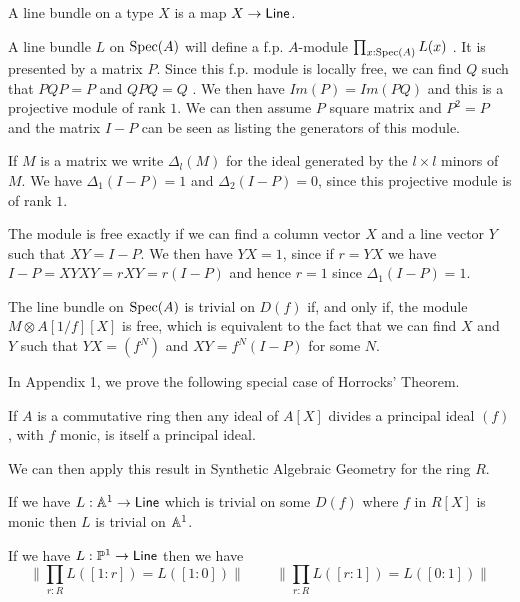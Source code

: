 A line bundle on a type $X$ is a map $X\rightarrow \mathsf{Line}$.


\medskip

 A line bundle $L$ on $\operatorname{Spec}(A)$ will define a f.p. $A$-module $\prod_{x:\operatorname{Spec}(A)}L(x)$ \cite{draft}.
It is presented by a matrix $P$.
Since this f.p. module is locally free, we can find $Q$ such that $PQP = P$ and
$QPQ = Q$ \cite{lombardi-quitte}. We then have $Im(P) = Im(PQ)$ and this is a projective module of rank $1$. We can then assume $P$ square matrix and
$P^2 = P$ and the matrix $I-P$ can  be seen as listing the generators of this module.

If $M$ is a matrix we write $\Delta_l(M)$ for the ideal generated by the $l\times l$ minors of
$M$. We have $\Delta_1(I-P) = 1$ and $\Delta_2(I-P) = 0$, since this projective module is of rank $1$.

The module is free exactly if we can find a column vector $X$ and a line vector $Y$ such that
$XY = I-P$. We then have $YX = 1$, since if $r = YX$ we have $I-P = XYXY = rXY = r(I-P)$ and
hence $r = 1$ since $\Delta_1(I-P) = 1$.

\medskip

The line bundle on $\operatorname{Spec}(A)$ is trivial on $D(f)$ if, and only if, the module $M\otimes A[1/f][X]$ is free, which
is equivalent to the fact that we can find $X$ and $Y$ such that $YX = (f^N)$ and $XY = f^N(I-P)$ for some $N$.

In Appendix 1, we prove the following special case of Horrocks' Theorem.

\begin{lemma}%
  If $A$ is a commutative ring
  then any ideal of $A[X]$ divides a principal ideal $(f)$, with $f$ monic, is itself a principal ideal.
\end{lemma}

We can then apply this result in Synthetic Algebraic Geometry for the ring $R$.

\begin{proposition}
  If we have $L:\mathbb{A}^1\rightarrow \mathsf{Line}$ which is trivial on some $D(f)$ where $f$ in $R[X]$ is monic
  then $L$ is trivial on $\mathbb{A}^1$.
\end{proposition}

\begin{corollary}\label{c1}
  If we have $L:\mathbb{P}^1\rightarrow \mathsf{Line}$ then we have
  $$\|{\prod_{r:R}L([1:r]) = L([1:0])}\|\,\,\,\,\,\,\,\,\,\,\,\,\,\|{\prod_{r:R}L([r:1]) = L([0:1])}\|$$
\end{corollary}

